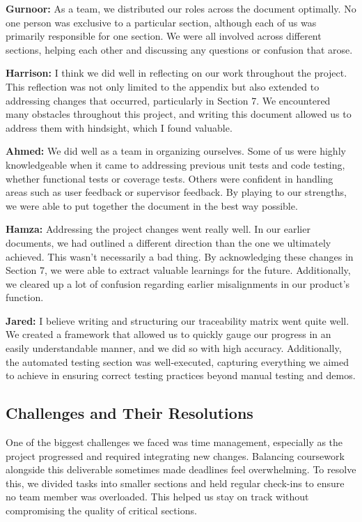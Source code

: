 \documentclass[12pt, titlepage]{article}
\begin{document}
\begin{enumerate}
  \textbf{Gurnoor:} As a team, we distributed our roles across the document optimally. No one person was exclusive to a particular section, although each of us was primarily responsible for one section. We were all involved across different sections, helping each other and discussing any questions or confusion that arose.
  
  \textbf{Harrison:} I think we did well in reflecting on our work throughout the project. This reflection was not only limited to the appendix but also extended to addressing changes that occurred, particularly in Section 7. We encountered many obstacles throughout this project, and writing this document allowed us to address them with hindsight, which I found valuable.
  
  \textbf{Ahmed:} We did well as a team in organizing ourselves. Some of us were highly knowledgeable when it came to addressing previous unit tests and code testing, whether functional tests or coverage tests. Others were confident in handling areas such as user feedback or supervisor feedback. By playing to our strengths, we were able to put together the document in the best way possible.
  
  \textbf{Hamza:} Addressing the project changes went really well. In our earlier documents, we had outlined a different direction than the one we ultimately achieved. This wasn’t necessarily a bad thing. By acknowledging these changes in Section 7, we were able to extract valuable learnings for the future. Additionally, we cleared up a lot of confusion regarding earlier misalignments in our product's function.
  
  \textbf{Jared:} I believe writing and structuring our traceability matrix went quite well. We created a framework that allowed us to quickly gauge our progress in an easily understandable manner, and we did so with high accuracy. Additionally, the automated testing section was well-executed, capturing everything we aimed to achieve in ensuring correct testing practices beyond manual testing and demos.
  
  \subsection{Challenges and Their Resolutions}
  
  One of the biggest challenges we faced was time management, especially as the project progressed and required integrating new changes. Balancing coursework alongside this deliverable sometimes made deadlines feel overwhelming. To resolve this, we divided tasks into smaller sections and held regular check-ins to ensure no team member was overloaded. This helped us stay on track without compromising the quality of critical sections.
  

\end{enumerate}
\end{document}
